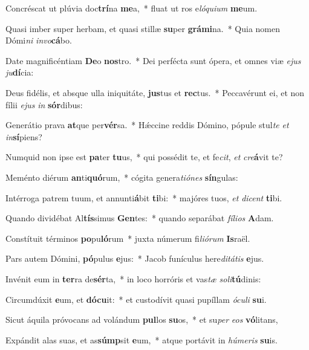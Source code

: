 \item Concréscat ut plúvia doc\textbf{trí}na \textbf{me}a,~* fluat ut ros e\textit{ló}\textit{qui}\textit{um} \textbf{me}um.
\item Quasi imber super herbam, et quasi stillæ \textbf{su}per \textbf{grá}\textbf{mi}na.~* Quia nomen Dómi\textit{ni} \textit{in}\textit{vo}\textbf{cá}bo.
\item Date magnificéntiam \textbf{De}o \textbf{nos}tro.~* Dei perfécta sunt ópera, et omnes viæ \textit{e}\textit{jus} \textit{ju}\textbf{dí}cia:
\item Deus fidélis, et absque ulla iniquitáte, \textbf{jus}tus et \textbf{rec}tus.~* Peccavérunt ei, et non fílii \textit{e}\textit{jus} \textit{in} \textbf{sór}dibus:
\item Generátio prava \textbf{at}que per\textbf{vér}sa.~* Hǽccine reddis Dómino, pópule stul\textit{te} \textit{et} \textit{in}\textbf{sí}piens?
\item Numquid non ipse est \textbf{pa}ter \textbf{tu}us,~* qui possédit te, et fe\textit{cit}, \textit{et} \textit{cre}\textbf{á}vit te?
\item Meménto diérum \textbf{an}ti\textbf{quó}rum,~* cógita genera\textit{ti}\textit{ó}\textit{nes} \textbf{sín}gulas:
\item Intérroga patrem tuum, et annunti\textbf{á}bit \textbf{ti}bi:~* majóres tuos, \textit{et} \textit{di}\textit{cent} \textbf{ti}bi.
\item Quando dividébat Al\textbf{tís}simus \textbf{Gen}tes:~* quando separábat \textit{fí}\textit{li}\textit{os} \textbf{A}dam.
\item Constítuit términos \textbf{po}pu\textbf{ló}rum~* juxta númerum fi\textit{li}\textit{ó}\textit{rum} \textbf{Is}raël.
\item Pars autem Dómini, \textbf{pó}pulus \textbf{e}jus:~* Jacob funículus here\textit{di}\textit{tá}\textit{tis} \textbf{e}jus.
\item Invénit eum in \textbf{ter}ra de\textbf{sér}ta,~* in loco horróris et vas\textit{tæ} \textit{so}\textit{li}\textbf{tú}dinis:
\item Circumdúxit \textbf{e}um, et \textbf{dó}\textbf{cu}it:~* et custodívit quasi pupíllam \textit{ó}\textit{cu}\textit{li} \textbf{su}i.
\item Sicut áquila próvocans ad volándum \textbf{pul}los \textbf{su}os,~* et su\textit{per} \textit{e}\textit{os} \textbf{vó}litans,
\item Expándit alas suas, et as\textbf{súmp}sit \textbf{e}um,~* atque portávit in \textit{hú}\textit{me}\textit{ris} \textbf{su}is.
